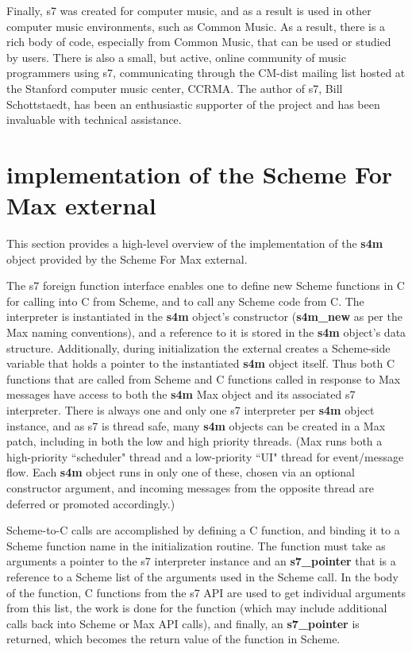 \documentclass[acmsmall, anonymous, review]{acmart}
\begin{document}
Finally, s7 was created for computer music, and as a result is used in other computer music
environments, such as Common Music. As a result, there is a rich body of code, especially
from Common Music, that can be used or studied by users. There is also a small, but active, 
online community of music programmers using s7, communicating through the CM-dist mailing
list hosted at the Stanford computer music center, CCRMA. The author of s7, Bill
Schottstaedt, has been an enthusiastic supporter of the project and has been invaluable
with technical assistance.  


\section{implementation of the Scheme For Max external}

This section provides a high-level overview of the implementation of the \textbf{s4m} 
object provided by the Scheme For Max external.

The s7 foreign function interface enables one to define new Scheme functions in C 
for calling into C from Scheme, and to call any Scheme code from C. 
The interpreter is instantiated
in the \textbf{s4m} object's constructor (\textbf{s4m\_new} as per the Max naming conventions), and
a reference to it is stored in the \textbf{s4m} object's data structure.
Additionally, during initialization the external creates a Scheme-side variable 
that holds a pointer to the instantiated \textbf{s4m} object itself. Thus
both C functions that are called from Scheme and C functions called in response to Max
messages have access to both the \textbf{s4m} Max object and its associated s7 interpreter.
There is always one and only one s7 interpreter per \textbf{s4m} object instance, and
as s7 is thread safe, many \textbf{s4m} objects can be created in a Max patch, including
in both the low and high priority threads. (Max runs both a high-priority ``scheduler" 
thread and a low-priority ``UI" thread for event/message flow. Each \textbf{s4m} object 
runs in only one of these, chosen via an optional constructor argument, and incoming messages
from the opposite thread are deferred or promoted accordingly.)

Scheme-to-C calls are accomplished by defining a C function, and binding
it to a Scheme function name in the initialization routine. 
The function must take as arguments a pointer to the s7 interpreter instance and an \textbf{s7\_pointer}
that is a reference to a Scheme list of the arguments used in the Scheme call.
In the body of the function, C functions from the s7 API are used to get 
individual arguments from this list, the work is done for the function 
(which may include additional calls back into Scheme or Max API calls),
and finally, an \textbf{s7\_pointer} is returned, which becomes the return value of the 
function in Scheme.
\end{document}
